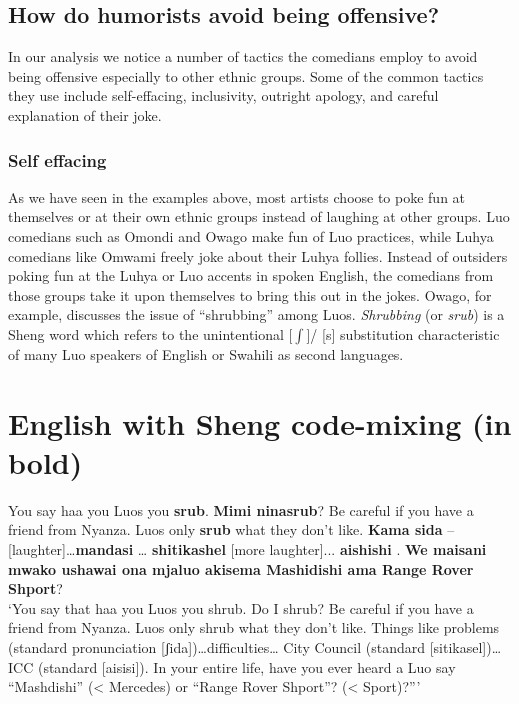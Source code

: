 \documentclass[output=paper]{langsci/langscibook}
\begin{document}
\section{How do humorists avoid being offensive? }

   In our analysis we notice a number of tactics the comedians employ to avoid being offensive especially to other ethnic groups. Some of the common tactics they use include self-effacing, inclusivity, outright apology, and careful explanation of their joke.

\subsection{Self effacing}

   As we have seen in the examples above, most artists choose to poke fun at themselves or at their own ethnic groups instead of laughing at other groups. Luo comedians such as Omondi and Owago make fun of Luo practices, while Luhya comedians like Omwami freely joke about their Luhya follies. Instead of outsiders poking fun at the Luhya or Luo accents in spoken English, the comedians from those groups take it upon themselves to bring this out in the jokes. Owago, for example, discusses the issue of “shrubbing” among Luos. \textit{Shrubbing} (or \textit{srub}) is a Sheng word which refers to the unintentional [${\int}$]/ [s] substitution characteristic of many Luo speakers of English or Swahili as second languages.

\chapter{English with Sheng code-mixing (in bold)}
\gll You say haa you Luos you \textbf{srub}. \textbf{Mimi ninasrub}? Be careful if you have a friend from Nyanza. Luos only \textbf{srub} what they don’t like. \textbf{Kama sida} –\textup{[laughter]}…\textbf{mandasi} … \textbf{shitikashel} \textup{[more laughter]}... \textbf{aishishi} . \textbf{We maisani mwako ushawai ona mjaluo akisema Mashidishi ama Range Rover Shport}?\\
‘You say that haa you Luos you shrub. Do I shrub? Be careful if you have a friend from Nyanza. Luos only shrub what they don’t like. Things like problems (standard pronunciation [ʃida])…difficulties… City Council (standard [sitikasel])… ICC (standard [aisisi]). In your entire life, have you ever heard a Luo say “Mashdishi” ({\textless} Mercedes) or “Range Rover Shport”? ({\textless} Sport)?”’ \citep{Churchill2013c}
\end{document}

